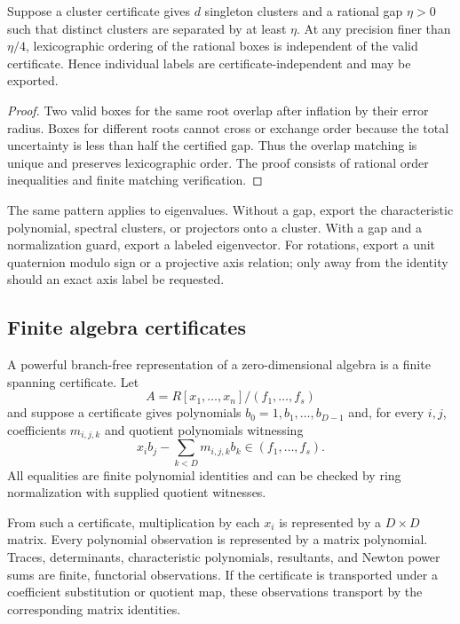 \begin{proposition}
Suppose a cluster certificate gives \(d\) singleton clusters and a rational
gap \(\eta>0\) such that distinct clusters are separated by at least \(\eta\).
At any precision finer than \(\eta/4\), lexicographic ordering of the rational
boxes is independent of the valid certificate.  Hence individual labels are
certificate-independent and may be exported.
\end{proposition}

\begin{proof}
Two valid boxes for the same root overlap after inflation by their error
radius.  Boxes for different roots cannot cross or exchange order because the
total uncertainty is less than half the certified gap.  Thus the overlap
matching is unique and preserves lexicographic order.  The proof consists of
rational order inequalities and finite matching verification.
\end{proof}

The same pattern applies to eigenvalues.  Without a gap, export the
characteristic polynomial, spectral clusters, or projectors onto a cluster.
With a gap and a normalization guard, export a labeled eigenvector.  For
rotations, export a unit quaternion modulo sign or a projective axis relation;
only away from the identity should an exact axis label be requested.

\subsection{Finite algebra certificates}

A powerful branch-free representation of a zero-dimensional algebra is a
finite spanning certificate.  Let
\[
 A=R[x_1,\ldots,x_n]/(f_1,\ldots,f_s)
\]
and suppose a certificate gives polynomials
\(b_0=1,b_1,\ldots,b_{D-1}\) and, for every \(i,j\), coefficients
\(m_{i,j,k}\) and quotient polynomials witnessing
\[
  x_i b_j-\sum_{k<D}m_{i,j,k}b_k\in(f_1,\ldots,f_s).
\]
All equalities are finite polynomial identities and can be checked by ring
normalization with supplied quotient witnesses.

\begin{theorem}
From such a certificate, multiplication by each \(x_i\) is represented by a
\(D\times D\) matrix.  Every polynomial observation is represented by a
matrix polynomial.  Traces, determinants, characteristic polynomials,
resultants, and Newton power sums are finite, functorial observations.  If the
certificate is transported under a coefficient substitution or quotient map,
these observations transport by the corresponding matrix identities.
\end{theorem}

